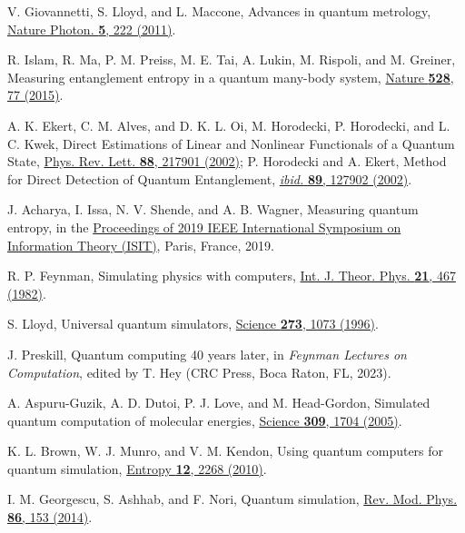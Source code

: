 \documentclass[aps,pra,twocolumn,floatfix,groupedaddress,superscriptaddress,nofootinbib,notitlepage]{revtex4-2}
\begin{document}
\begin{thebibliography}{100}
 V. Giovannetti, S. Lloyd, and L. Maccone, Advances in quantum metrology, \href{https://doi.org/10.1038/nphoton.2011.35}{Nature Photon. \textbf{5}, 222 (2011)}.

 R. Islam, R. Ma, P. M. Preiss, M. E. Tai, A. Lukin, M. Rispoli, and M. Greiner, Measuring entanglement entropy in a quantum many-body system, \href{https://doi.org/10.1038/nature15750}{Nature \textbf{528}, 77 (2015)}.

 A. K. Ekert, C. M. Alves, and D. K. L. Oi, M. Horodecki, P. Horodecki, and L. C. Kwek, Direct Estimations of Linear and Nonlinear Functionals of a Quantum State, \href{https://doi.org/10.1103/PhysRevLett.88.217901}{Phys. Rev. Lett. \textbf{88}, 217901 (2002)}; P. Horodecki and A. Ekert, Method for Direct Detection of Quantum Entanglement, \href{https://doi.org/10.1103/PhysRevLett.89.127902}{\textit{ibid.} \textbf{89}, 127902 (2002)}. 

 J. Acharya, I. Issa, N. V. Shende, and A. B. Wagner, Measuring quantum entropy, in the \href{https://doi.org/10.1109/ISIT.2019.8849572}{Proceedings of 2019 IEEE International Symposium on Information Theory (ISIT)}, Paris, France, 2019.

 R. P. Feynman, Simulating physics with computers, \href{https://doi.org/10.1007/BF02650179}{Int. J. Theor. Phys. \textbf{21}, 467 (1982)}.

 S. Lloyd, Universal quantum simulators, \href{https://doi.org/10.1126/science.273.5278.1073}{Science \textbf{273}, 1073 (1996)}.

 J. Preskill, Quantum computing 40 years later, in \emph{Feynman Lectures on Computation}, edited by T. Hey (CRC Press, Boca Raton, FL, 2023).

 A. Aspuru-Guzik, A. D. Dutoi, P. J. Love, and M. Head-Gordon, Simulated quantum computation of molecular energies, \href{https://doi.org/10.1126/science.1113479}{Science \textbf{309}, 1704 (2005)}.

 K. L. Brown, W. J. Munro, and V. M. Kendon, Using quantum computers for quantum simulation, \href{https://doi.org/10.3390/e12112268}{Entropy \textbf{12}, 2268 (2010)}.

 I. M. Georgescu, S. Ashhab, and F. Nori, Quantum simulation, \href{https://doi.org/10.1103/RevModPhys.86.153}{Rev. Mod. Phys. \textbf{86}, 153 (2014)}.


\end{thebibliography}
\end{document}
